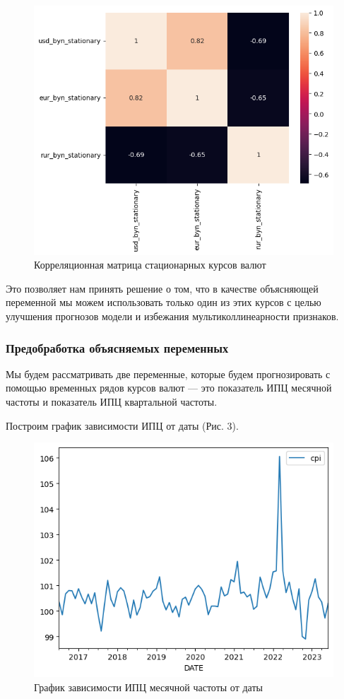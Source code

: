 \documentclass[a4paper, 12pt]{extarticle}
\begin{document}
	\begin{figure}[tph!]
		\centering
		\includegraphics[scale=0.8]{images/pic_02}
		\caption[Рис. 2]{Корреляционная матрица стационарных курсов валют}
		\label{fig:pic02}
	\end{figure}
	
	Это позволяет нам принять решение о том, что в качестве объясняющей переменной мы можем использовать только один из этих курсов с целью улучшения прогнозов модели и избежания мультиколлинеарности признаков.
	
	\subsubsection{Предобработка объясняемых переменных}
	
	Мы будем рассматривать две переменные, которые будем прогнозировать с помощью временных рядов курсов валют --- это показатель ИПЦ месячной частоты и показатель ИПЦ квартальной частоты.
	
	Построим график зависимости ИПЦ от даты (Рис. 3).
	\begin{figure}[bph!]
		\centering
		\includegraphics[scale=0.8]{images/pic_03}
		\caption[Рис. 3]{График зависимости ИПЦ месячной частоты от даты}
		\label{fig:pic03}
	\end{figure}
	
\end{document}
